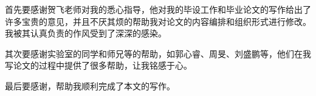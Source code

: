 \begin{ack}
  首先要感谢贺飞老师对我的悉心指导，他对我的毕设工作和毕业论文的写作给出了许多宝贵的意见，并且不厌其烦的帮助我对论文的内容编排和组织形式进行修改。我被其认真负责的作风受到了深深的感染。
  
  其次要感谢实验室的同学和师兄等的帮助，如郭心睿、周旻、刘盛鹏等，他们在我写论文的过程中提供了很多帮助，让我铭感于心。
  
  最后要感谢\thuthesis，帮助我顺利完成了本文的写作。
\end{ack}